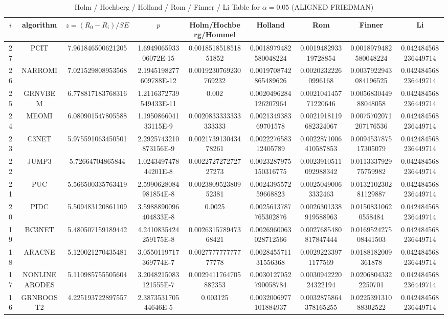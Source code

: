 \documentclass[a4paper,10pt]{article}
\begin{document}
\begin{landscape}
\begin{table}[!htp]
\centering\scriptsize
\caption{Holm / Hochberg / Holland / Rom / Finner / Li Table for $\alpha=0.05$ (ALIGNED FRIEDMAN)}
\begin{tabular}{ccccccccc}
$i$&algorithm&$z=(R_0 - R_i)/SE$&$p$&Holm/Hochberg/Hommel&Holland&Rom&Finner&Li\\
\hline
27&PCIT&7.961846500621205&1.694906593306072E-15&0.001851851851851852&0.0018979482580048224&0.001948293319728854&0.0018979482580048224&0.042484568236449714\\
26&NARROMI&7.021529808953568&2.1945198277609788E-12&0.0019230769230769232&0.0019708742865489626&0.00202322260996168&0.0037922943084196525&0.042484568236449714\\
25&GRNVBEM&6.778817183768316&1.2116372739549433E-11&0.002&0.0020496284126207964&0.002104145771220646&0.005683044988048058&0.042484568236449714\\
24&MEOMI&6.080901547805588&1.195086604133115E-9&0.0020833333333333333&0.002134938369701578&0.0021918119682324067&0.0075702071207176536&0.042484568236449714\\
23&C3NET&5.975591063450501&2.2925743210873156E-9&0.002173913043478261&0.002227658312405789&0.0022871006410587853&0.009453787517305079&0.042484568236449714\\
22&JUMP3&5.72664704865844&1.024349747844201E-8&0.002272727272727273&0.0023287975150316775&0.0023910511092988342&0.011333792975759982&0.042484568236449714\\
21&PUC&5.566500335763419&2.5990628084981854E-8&0.002380952380952381&0.002439557259668823&0.00250490063332463&0.013210230281129887&0.042484568236449714\\
20&PIDC&5.509483120861109&3.5988890096404833E-8&0.0025&0.0025613787765302876&0.0026301338919588963&0.01508310620558484&0.042484568236449714\\
19&BC3NET&5.480507159189442&4.2410835424259175E-8&0.002631578947368421&0.0026960063028712566&0.0027685480817847444&0.016952427508441503&0.042484568236449714\\
18&ARACNE&5.120021270435481&3.0550119717369774E-7&0.002777777777777778&0.002845571131556368&0.00292233971177569&0.0188182009361878&0.042484568236449714\\
17&NONLINEARODES&5.110985755505604&3.2048215083121555E-7&0.0029411764705882353&0.0030127052790058784&0.003094222024322194&0.02068043322250701&0.042484568236449714\\
16&GRNBOOST2&4.225193722897557&2.387353170544646E-5&0.003125&0.0032006977101884937&0.0032875864378165255&0.022539131088302522&0.042484568236449714\\

\end{tabular}
\end{table}
\end{landscape}
\end{document}
